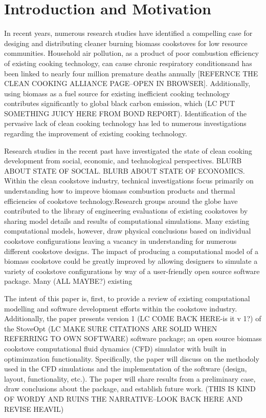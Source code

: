\documentclass[3p,times,twocolumn]{elsarticle}
\begin{document}
\section{Introduction and Motivation}
In recent years, numerous research studies have identified a compelling case for desiging and distributing cleaner burning biomass cookstoves for low resource communities. Household air pollution, as a product of poor combustion efficiency of existing cooking technology, can cause chronic respiratory conditionsand has been linked to nearly four million premature deaths annually [REFERNCE THE CLEAN COOKING ALLIANCE PAGE--OPEN IN BROWSER]. Additionally, using biomass as a fuel source for existing inefficient cooking technology contributes significantly to global black carbon emission, which (LC PUT SOMETHING JUICY HERE FROM BOND REPORT). Identification of the pervasive lack of clean cooking technology has led to numerous investigations regarding the improvement of existing cooking technology.

Research studies in the recent past have investigated the state of clean cooking development from social, economic, and technological perspectives. BLURB ABOUT STATE OF SOCIAL. BLURB ABOUT STATE OF ECONOMICS. Within the clean cookstove industry, technical investigations focus primarily on understanding how to improve biomass combustion products and thermal efficiencies of cookstove technology.Research groups around the globe have contributed to the library of engineering evaluations of existing cookstoves by sharing model details and results of computational simulations. Many existing computational models, however, draw physical conclusions based on individual cookstove configurations leaving a vacancy in understanding for numerous different cookstove designs. The impact of producing a computational model of a biomass cookstove could be greatly improved by allowing designers to simulate a variety of cookstove configurations by way of a user-friendly open source software package.   Many (ALL MAYBE?) existing 

The intent of this paper is, first, to provide a review of existing computational modelling and software development efforts within the cookstove industry. Additionally, the paper presents version 1 (LC COME BACK HERE-is it v 1?) of the StoveOpt (LC MAKE SURE CITATIONS ARE SOLID WHEN REFERRING TO OWN SOFTWARE) software package; an open source biomass cookstove computational fluid dynamics (CFD) simulator with built in optimimzation functionality. Specifically, the paper will discuss on the methodoly used in the CFD simulations and the implementation of the software (design, layout, functionality, etc.). The paper will share results from a preliminary case, draw conclusions about the package, and establish future work.
(THIS IS KIND OF WORDY AND RUINS THE NARRATIVE--LOOK BACK HERE AND REVISE HEAVIL)
\end{document}
